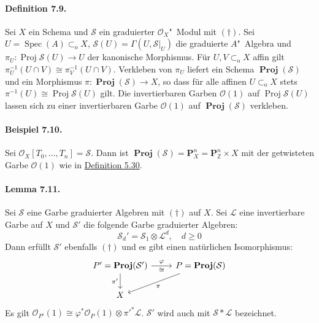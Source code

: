 \paragraph{Definition 7.9.}\label{7.9} Sei $X$ ein Schema und $\mathcal{S}$ ein graduierter $\mathcal{O}_X$"~Modul mit $(\dagger)$. Sei $U=\operatorname{Spec}(A)\subset_\text{o}X$, $\mathcal{S}(U)=\Gamma(U,\mathcal{S}|_U)$ die graduierte $A$"~Algebra und $\pi_U:\operatorname{Proj}\mathcal{S}(U)\to U$ der kanonische Morphismus. Für $U,V\subset_\text{o}X$ affin gilt $\pi_U^{-1}(U\cap V)\cong\pi_V^{-1}(U\cap V)$. Verkleben von $\pi_U$ liefert ein Schema $\operatorname{\mathbf{Proj}}(\mathcal{S})$ und ein Morphismus $\pi:\operatorname{\mathbf{Proj}}(\mathcal{S})\to X$, so dass für alle affinen $U\subset_\text{o}X$ stets $\pi^{-1}(U)\cong\operatorname{Proj}\mathcal{S}(U)$ gilt. Die invertierbaren Garben $\mathcal{O}(1)$ auf $\operatorname{Proj}\mathcal{S}(U)$ lassen sich zu einer invertierbaren Garbe $\mathcal{O}(1)$ auf $\operatorname{\mathbf{Proj}}(\mathcal{S})$ verkleben.

\paragraph{Beispiel 7.10.}\label{7.10} Sei $\mathcal{O}_X[T_0,\ldots,T_n]=\mathcal{S}$. Dann ist $\operatorname{\mathbf{Proj}}(\mathcal{S})=\mathbf{P}_X^n=\mathbf{P}_\mathbb{Z}^n\times X$ mit der getwisteten Garbe $\mathcal{O}(1)$ wie in \hyperref[5.30]{Definition 5.30}.

\paragraph{Lemma 7.11.}\label{7.11} Sei $\mathcal{S}$ eine Garbe graduierter Algebren mit $(\dagger)$ auf $X$. Sei $\mathcal{L}$ eine invertierbare Garbe auf $X$ und $\mathcal{S}'$ die folgende Garbe graduierter Algebren:
\[\mathcal{S}_d' =\mathcal{S}_1\otimes\mathcal{L}^d,\quad d\geq 0 \]
Dann erfüllt $\mathcal{S}'$ ebenfalls $(\dagger)$ und es gibt einen natürlichen Isomorphismus:
\[\begin{tikzcd}
P'=\operatorname{\mathbf{Proj}}(\mathcal{S}')\ar[d, "\pi'"']\ar[r, "\varphi", "\cong"'] & P=\operatorname{\mathbf{Proj}}(\mathcal{S})\ar[dl, "\pi"]\\
X&
\end{tikzcd} \]
Es gilt $\mathcal{O}_{P'}(1)\cong \varphi^\ast\mathcal{O}_P(1)\otimes\pi'^\ast\mathcal{L}$. $\mathcal{S}'$ wird auch mit $\mathcal{S}\ast\mathcal{L}$ bezeichnet.

